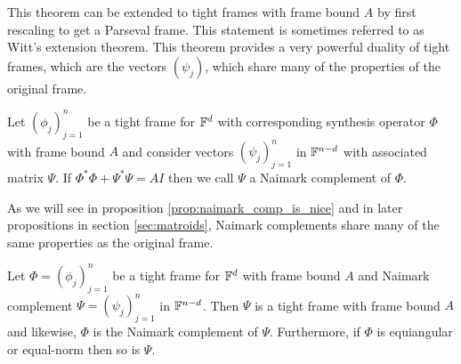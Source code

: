 This theorem can be extended to tight frames with frame bound $A$ by first rescaling
to get a Parseval frame. This statement is sometimes referred to as Witt's extension theorem. This theorem provides a very powerful duality of tight frames, which are the vectors $(\psi_j)$, which share many of the properties of the original frame.
\begin{Definition}
\label{def:naimark_comp}
    Let $(\phi_j)_{j=1}^n$ be a tight frame for $\mathbb{F}^d$ with corresponding synthesis operator $\Phi$ with frame bound $A$ and consider vectors $(\psi_j)_{j=1}^n$ in $\mathbb{F}^{n-d}$ with associated matrix $\Psi$. If $\Phi^*\Phi+\Psi^*\Psi=AI$ then we call $\Psi$ a Naimark complement of $\Phi$.
\end{Definition}
As we will see in proposition \ref{prop:naimark_comp_is_nice} and in later propositions in section \ref{sec:matroids}, Naimark complements share many of the same properties as the original frame.
\begin{prop}
\label{prop:naimark_comp_is_nice}
    Let $\Phi=(\phi_j)_{j=1}^n$ be a tight frame for $\mathbb{F}^d$ with frame bound $A$ and Naimark complement $\Psi=(\psi_j)_{j=1}^n$ in $\mathbb{F}^{n-d}$. Then $\Psi$ is a tight frame with frame bound $A$ and likewise, $\Phi$ is the Naimark complement of $\Psi$. Furthermore, if $\Phi$ is equiangular or equal-norm then so is $\Psi$.
\end{prop}
